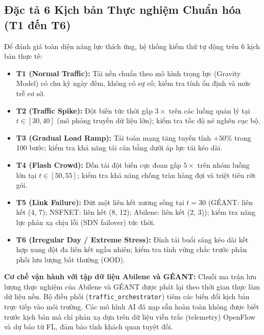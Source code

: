 \documentclass[11pt,a4paper]{article}
\begin{document}
\subsection{Đặc tả 6 Kịch bản Thực nghiệm Chuẩn hóa (T1 đến T6)}
Để đánh giá toàn diện năng lực thích ứng, hệ thống kiểm thử tự động trên 6 kịch bản thực tế:
\begin{itemize}
    \item \textbf{T1 (Normal Traffic):} Tải nền chuẩn theo mô hình trọng lực (Gravity Model) có chu kỳ ngày đêm, không có sự cố; kiểm tra tính ổn định và mức trễ cơ sở.
    \item \textbf{T2 (Traffic Spike):} Đột biến tức thời gấp $3\times$ trên các luồng quản lý tại $t \in [30, 40]$ (mô phỏng truyền dữ liệu lớn); kiểm tra tốc độ né nghẽn cục bộ.
    \item \textbf{T3 (Gradual Load Ramp):} Tải toàn mạng tăng tuyến tính $+50\%$ trong 100 bước; kiểm tra khả năng tái cân bằng dưới áp lực tải kéo dài.
    \item \textbf{T4 (Flash Crowd):} Dồn tải đột biến cực đoan gấp $5\times$ trên nhóm luồng lớn tại $t \in [50, 55]$; kiểm tra khả năng chống tràn hàng đợi và triệt tiêu rớt gói.
    \item \textbf{T5 (Link Failure):} Đứt một liên kết xương sống tại $t=30$ (GÉANT: liên kết (4, 7); NSFNET: liên kết (8, 12); Abilene: liên kết (2, 3)); kiểm tra năng lực phản xạ chịu lỗi (SDN failover) tức thời.
    \item \textbf{T6 (Irregular Day / Extreme Stress):} Đỉnh tải buổi sáng kéo dài kết hợp xung đột đa liên kết ngẫu nhiên; kiểm tra tính vững chắc trước phân phối lưu lượng bất thường (OOD).
\end{itemize}
\textbf{Cơ chế vận hành với tập dữ liệu Abilene và GÉANT:} Chuỗi ma trận lưu lượng thực nghiệm của Abilene và GÉANT được phát lại theo thời gian thực làm dữ liệu nền. Bộ điều phối (\texttt{traffic\_orchestrator}) tiêm các biến đổi kịch bản trực tiếp vào môi trường. Các mô hình AI đã nạp sẵn hoàn toàn không được biết trước kịch bản mà chỉ phản xạ dựa trên dữ liệu viễn trắc (telemetry) OpenFlow và dự báo từ FL, đảm bảo tính khách quan tuyệt đối.
\end{document}
